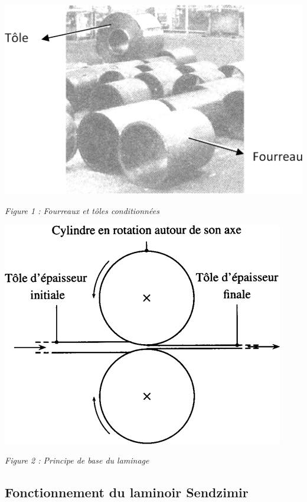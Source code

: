 \documentclass[11pt,oneside]{article}
\begin{document}
\noindent\begin{minipage}[c]{.48\linewidth}
\begin{center}
\includegraphics[width=.95\textwidth]{png/figure_01}

\textit{Figure 1 : Fourreaux et tôles conditionnées}
\end{center}
\end{minipage}\hfill
\begin{minipage}[c]{.48\linewidth}
\begin{center}
\includegraphics[width=.95\textwidth]{png/figure_02}

\textit{Figure 2 : Principe de base du laminage}
\end{center}
\end{minipage}\hfill


\subsection{Fonctionnement du laminoir Sendzimir}
\end{document}
